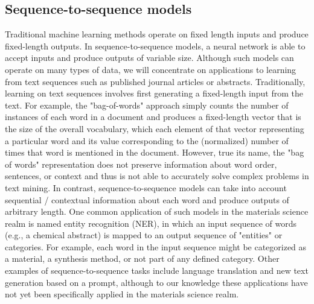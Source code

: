 \documentclass[pdflatex,sn-mathphys]{sn-jnl}%
\theoremstyle{thmstyleone}%
\theoremstyle{thmstyletwo}%
\theoremstyle{thmstylethree}%
\begin{document}
\subsection{Sequence-to-sequence models}\label{sec:sequence}
Traditional machine learning methods operate on fixed length inputs and produce fixed-length outputs. In sequence-to-sequence models, a neural network is able to accept inputs and produce outputs of variable size. Although such models can operate on many types of data, we will concentrate on applications to learning from text sequences such as published journal articles or abstracts.
Traditionally, learning on text sequences involves first generating a fixed-length input from the text. For example, the "bag-of-words" approach simply counts the number of instances of each word in a document and produces a fixed-length vector that is the size of the overall vocabulary, which each element of that vector representing a particular word and its value corresponding to the (normalized) number of times that word is mentioned in the document. However, true its name, the "bag of words" representation does not preserve information about word order, sentences, or context and thus is not able to accurately solve complex problems in text mining.
In contrast, sequence-to-sequence models can take into account sequential / contextual information about each word and produce outputs of arbitrary length. One common application of such models in the materials science realm is named entity recognition (NER), in which an input sequence of words (e.g., a chemical abstract) is mapped to an output sequence of "entities" or categories. For example, each word in the input sequence might be categorized as a material, a synthesis method, or not part of any defined category. Other examples of sequence-to-sequence tasks include language translation and new text generation based on a prompt, although to our knowledge these applications have not yet been specifically applied in the materials science realm.
\end{document}

